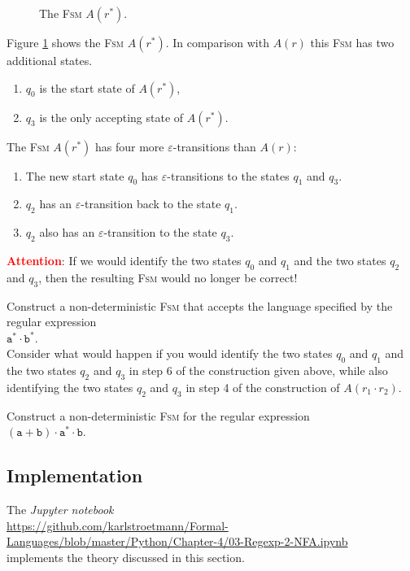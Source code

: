 \begin{enumerate}
      \begin{figure}[!ht]
        \centering
      \caption{The \textsc{Fsm} $A(r^*)$.}
      \label{fig:aStar.eps}
      \end{figure}
      Figure \ref{fig:aStar.eps} shows the \textsc{Fsm} $A(r^*)$.
      In comparison with $A(r)$ this \textsc{Fsm} has two additional states.
      \begin{enumerate}
      \item $q_0$ is the start state of $A(r^*)$,
      \item $q_3$ is the only accepting state of $A(r^*)$.
      \end{enumerate}
      The \textsc{Fsm} $A(r^*)$ has four more $\varepsilon$-transitions than $A(r)$: 
      \begin{enumerate}
      \item The new start state  $q_0$ has $\varepsilon$-transitions to the states
            $q_1$ and $q_3$.
      \item $q_2$ has an $\varepsilon$-transition back to the state $q_1$.
      \item $q_2$ also has an $\varepsilon$-transition to the state $q_3$.
      \end{enumerate}
      \textbf{\textcolor{red}{Attention}}:  If we would identify the two states 
      $q_0$ and $q_1$ and the two states $q_2$ and $q_3$, then the resulting \textsc{Fsm} would no longer be
      correct!
\end{enumerate}

\exerciseEng
Construct a non-deterministic \textsc{Fsm} that accepts the language specified by the regular expression
\\[0.2cm]
\hspace*{1.3cm}
$\texttt{a}^* \cdot \texttt{b}^*$.
\\[0.2cm]
Consider what would happen if you would identify the two states 
$q_0$ and $q_1$ and the two states $q_2$ and $q_3$ in step 6 of the construction given above, while also
identifying the two states $q_2$ and $q_3$ in step 4 of the construction of $A(r_1 \cdot r_2)$.
\eox

\exerciseEng
Construct a non-deterministic \textsc{Fsm} for the regular expression
\\[0.2cm]
\hspace*{1.3cm}
$(\texttt{a} + \texttt{b}) \cdot \texttt{a}^* \cdot \texttt{b}$.  
\eox

\subsection{Implementation}
The \textsl{Jupyter notebook} 
\\[0.2cm]
\hspace*{0.3cm}
\href{https://github.com/karlstroetmann/Formal-Languages/blob/master/Python/Chapter-4/03-Regexp-2-NFA.ipynb}{https://github.com/karlstroetmann/Formal-Languages/blob/master/Python/Chapter-4/03-Regexp-2-NFA.ipynb} 
\\[0.2cm]
implements the theory discussed in this section.




